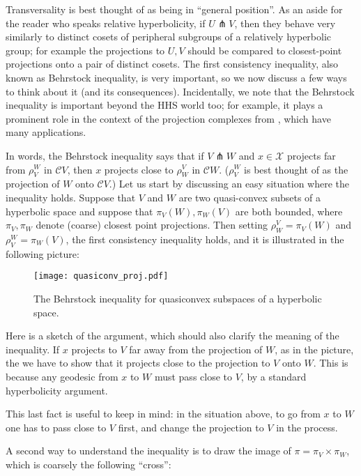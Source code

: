 \documentclass[11pt,oneside]{amsart}
\theoremstyle{definition}
\newcommand{\cuco}[1]{{\mathcal #1}}
\newcommand{\fontact}{{\mathcal C}}
\newcommand{\transverse}{\pitchfork}
\begin{document}
 
 \par\bigskip

 Transversality is best thought of as being in ``general position''. As an aside for the reader who speaks relative hyperbolicity, if $U\transverse V$, then they behave very similarly to distinct cosets of peripheral subgroups of a relatively hyperbolic group; for example the  projections to $U,V$ should be compared to closest-point projections onto a pair of distinct cosets. The first consistency inequality, also known as Behrstock inequality, is very important, so we now discuss a few ways to think about it (and its consequences). Incidentally, we note that the Behrstock inequality is important beyond the HHS world too; for example, it plays a prominent role in the context of the projection complexes from \cite{BBF}, which have many applications.
 
 In words, the Behrstock inequality says that if $V\transverse W$ and $x\in\cuco X$ projects far from $\rho^W_V$ in $\fontact V$, then $x$ projects close to $\rho^V_W$ in $\fontact W$. ($\rho^W_V$ is best thought of as the projection of $W$ onto $\fontact V$.)
 Let us start by discussing an easy situation where the inequality holds. Suppose that $V$ and $W$ are two quasi-convex subsets of a hyperbolic space and suppose that $\pi_V(W),\pi_W(V)$ are both bounded, where $\pi_V,\pi_W$ denote (coarse) closest point projections. Then setting $\rho^V_W=\pi_V(W)$ and $\rho^W_V=\pi_W(V)$, the first consistency inequality holds, and it is illustrated in the following picture:
 
 \begin{figure}[h]
  \texttt{[image: quasiconv\_proj.pdf]}
  \caption{The Behrstock inequality for quasiconvex subspaces of a hyperbolic space.}\label{fig:Behr}
 \end{figure}

 
 Here is a sketch of the argument, which should also clarify the meaning of the inequality. If $x$ projects to $V$ far away from the projection of $W$, as in the picture, the we have to show that it projects close to the projection to $V$ onto $W$. This is because any geodesic from $x$ to $W$ must pass close to $V$, by a standard hyperbolicity argument.
 
 This last fact is useful to keep in mind: in the situation above, to go from $x$ to $W$ one has to pass close to $V$ first, and change the projection to $V$ in the process.
 
 A second way to understand the inequality is to draw the image of $\pi=\pi_V\times\pi_W$, which is coarsely the following ``cross'':
 
\end{document}
